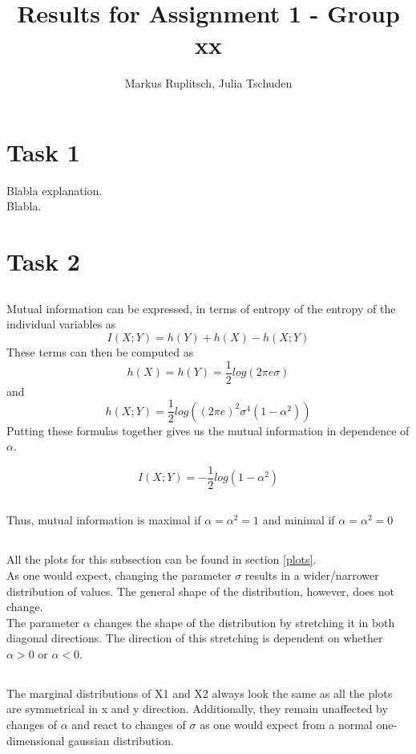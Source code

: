 \documentclass{article}
\title{\textbf{Results for Assignment 1 - Group xx}}
\author{Markus Ruplitsch, Julia Tschuden}
\begin{document}
\maketitle

\section{Task 1}
Blabla explanation.\\
Blabla.

\section{Task 2}
\subsection{}
Mutual information can be expressed, in terms of entropy of the entropy of the individual variables as
$$I(X;Y)=h(Y)+h(X)-h(X;Y)$$
These terms can then be computed as
$$h(X)=h(Y)=\frac{1}{2}log(2\pi e\sigma )$$
and
$$h(X;Y)=\frac{1}{2}log((2\pi e)^2\sigma ^4(1-\alpha ^2))$$
Putting these formulas together gives us the mutual information in dependence of $\alpha$.

$$I(X;Y)=-\frac{1}{2}log(1-\alpha^2)$$

\subsection{}
Thus, mutual information is maximal if $\alpha =\alpha ^2=1$ and minimal if $\alpha =\alpha ^2=0$

\subsection{}
All the plots for this subsection can be found in section \ref{plots}.\\
As one would expect, changing the parameter $\sigma$ results in a wider/narrower distribution of values. The general shape of the distribution, however, does not change.\\
The parameter $\alpha$ changes the shape of the distribution by stretching it in both diagonal directions. The direction of this stretching is dependent on whether $\alpha > 0$ or $\alpha < 0$.

\subsection{}
The marginal distributions of X1 and X2 always look the same as all the plots are symmetrical in x and y direction. Additionally, they remain unaffected by changes of $\alpha$ and react to changes of $\sigma$ as one would expect from a normal one-dimensional gaussian distribution.
\end{document}
